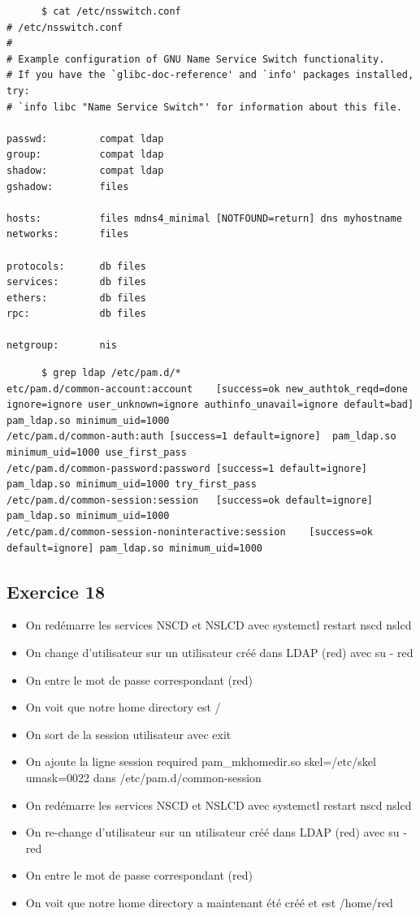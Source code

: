\documentclass{report}
\begin{document}
\begin{tcolorbox}
  \begin{verbatim}
      $ cat /etc/nsswitch.conf
# /etc/nsswitch.conf
#
# Example configuration of GNU Name Service Switch functionality.
# If you have the `glibc-doc-reference' and `info' packages installed, try:
# `info libc "Name Service Switch"' for information about this file.

passwd:         compat ldap
group:          compat ldap
shadow:         compat ldap
gshadow:        files

hosts:          files mdns4_minimal [NOTFOUND=return] dns myhostname
networks:       files

protocols:      db files
services:       db files
ethers:         db files
rpc:            db files

netgroup:       nis
  \end{verbatim}
\end{tcolorbox}

\begin{tcolorbox}
  \begin{verbatim}
      $ grep ldap /etc/pam.d/*
etc/pam.d/common-account:account	[success=ok new_authtok_reqd=done ignore=ignore user_unknown=ignore authinfo_unavail=ignore default=bad]	pam_ldap.so minimum_uid=1000
/etc/pam.d/common-auth:auth	[success=1 default=ignore]	pam_ldap.so minimum_uid=1000 use_first_pass
/etc/pam.d/common-password:password	[success=1 default=ignore]	pam_ldap.so minimum_uid=1000 try_first_pass
/etc/pam.d/common-session:session	[success=ok default=ignore]	pam_ldap.so minimum_uid=1000
/etc/pam.d/common-session-noninteractive:session	[success=ok default=ignore]	pam_ldap.so minimum_uid=1000
  \end{verbatim}
\end{tcolorbox}
\subsection{Exercice 18}
\begin{itemize}
\item On redémarre les services NSCD et NSLCD avec systemctl restart nscd nslcd
\item On change d'utilisateur sur un utilisateur créé dans LDAP (red) avec su - red
\item On entre le mot de passe correspondant (red)
\item On voit que notre home directory est /
\item On sort de la session utilisateur avec exit
\item On ajoute la ligne session required pam\_mkhomedir.so skel=/etc/skel umask=0022 dans /etc/pam.d/common-session
\item On redémarre les services NSCD et NSLCD avec systemctl restart nscd nslcd
\item On re-change d'utilisateur sur un utilisateur créé dans LDAP (red) avec su - red
\item On entre le mot de passe correspondant (red)
\item On voit que notre home directory a maintenant été créé et est /home/red
\end{itemize}
\end{document}
